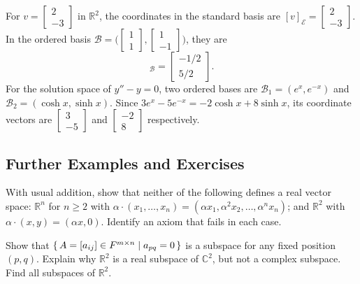 \begin{Example}
For $v=\begin{bmatrix}2\\-3\end{bmatrix}$ in $\mathbb R^2$, the coordinates in the standard basis are $[v]_{\mathcal E}=\begin{bmatrix}2\\-3\end{bmatrix}$. In the ordered basis $\mathcal B=\bigl(\begin{bmatrix}1\\1\end{bmatrix},\begin{bmatrix}1\\-1\end{bmatrix}\bigr)$, they are
\begin{equation*}
[v]_{\mathcal B}=\begin{bmatrix}-1/2\\5/2\end{bmatrix}.
\end{equation*}
For the solution space of $y''-y=0$, two ordered bases are $\mathcal B_1=(e^x,e^{-x})$ and $\mathcal B_2=(\cosh x,\sinh x)$. Since $3e^x-5e^{-x}=-2\cosh x+8\sinh x$, its coordinate vectors are $\begin{bmatrix}3\\-5\end{bmatrix}$ and $\begin{bmatrix}-2\\8\end{bmatrix}$ respectively.
\end{Example}

\subsection{Further Examples and Exercises}

\begin{Exercise}
With usual addition, show that neither of the following defines a real vector space: $\mathbb R^n$ for $n\ge2$ with $\alpha\cdot(x_1,\ldots,x_n)=(\alpha x_1,\alpha^2x_2,\ldots,\alpha^nx_n)$; and $\mathbb R^2$ with $\alpha\cdot(x,y)=(\alpha x,0)$. Identify an axiom that fails in each case.
\end{Exercise}

\begin{Exercise}
Show that $\qty{\, A=[a_{ij}]\in F^{m\times n} \mid a_{pq}=0 \,}$ is a subspace for any fixed position $(p,q)$. Explain why $\mathbb R^2$ is a real subspace of $\mathbb C^2$, but not a complex subspace. Find all subspaces of $\mathbb R^2$.
\end{Exercise}

